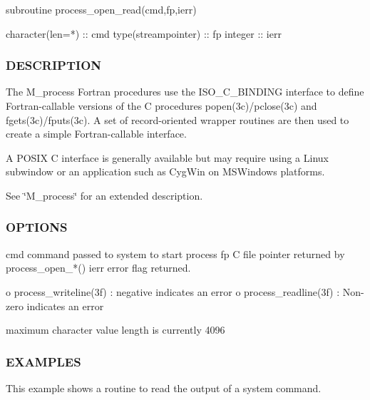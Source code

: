 \begin{DoxyVerb} subroutine process_open_read(cmd,fp,ierr)

   character(len=*)    :: cmd
   type(streampointer) :: fp
   integer             :: ierr
\end{DoxyVerb}


\subsubsection*{D\+E\+S\+C\+R\+I\+P\+T\+I\+ON}

The M\+\_\+process Fortran procedures use the I\+S\+O\+\_\+\+C\+\_\+\+B\+I\+N\+D\+I\+NG interface to define Fortran-\/callable versions of the C procedures popen(3c)/pclose(3c) and fgets(3c)/fputs(3c). A set of record-\/oriented wrapper routines are then used to create a simple Fortran-\/callable interface.

A P\+O\+S\+IX C interface is generally available but may require using a Linux subwindow or an application such as Cyg\+Win on M\+S\+Windows platforms.

See \char`\"{}\+M\+\_\+process\char`\"{} for an extended description.

\subsubsection*{O\+P\+T\+I\+O\+NS}

\begin{DoxyVerb}cmd      command passed to system to start process
fp       C file pointer returned by process_open_*()
ierr     error flag returned.

          o process_writeline(3f) : negative indicates an error
          o process_readline(3f)  : Non-zero indicates an error

maximum character value length is currently 4096
\end{DoxyVerb}


\subsubsection*{E\+X\+A\+M\+P\+L\+ES}

This example shows a routine to read the output of a system command.

